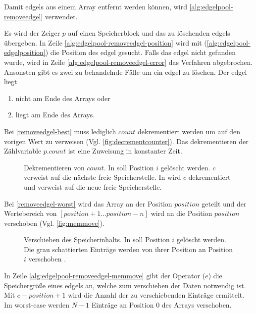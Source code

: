 Damit \glspl{edgel} aus einem Array entfernt werden können, wird \autoref{alg:edgelpool-removeedgel} verwendet.

Es wird der Zeiger $p$ auf einen Speicherblock und das zu löschenden \glspl{edgel} übergeben. In Zeile
 \ref{alg:edgelpool-removeedgel-position} wird mit  (\autoref{alg:edgelpool-edgelposition}) die
 Position des \gls{edgel} gesucht. Falls das \gls{edgel} nicht gefunden wurde, wird in Zeile
 \ref{alg:edgelpool-removeedgel-error} das Verfahren abgebrochen. Ansonsten gibt es zwei zu behandelnde Fälle um ein
 \gls{edgel} zu löschen. Der \gls{edgel} liegt
\begin{enumerate}
	\item nicht am Ende des Arrays oder \label{removeedgel-worst}
	\item liegt am Ende des Arrays. \label{removeedgel-best}
\end{enumerate}
Bei \autoref{removeedgel-best} muss lediglich $\mathit{count}$ dekrementiert werden um auf den vorigen Wert zu
 verweisen (Vgl. \autoref{fig:decrementcounter}). Das dekrementieren der Zählvariable $\mathit{p.count}$ ist eine
 Zuweisung in konstanter Zeit.
\begin{figure}[!ht]
	\centering
	\subfigure[]{
		
		\label{fig:decrementcounter-before}
	}
	\subfigure[]{
		
		\label{fig:decrementcounter-after}
	}
	\caption{Dekrementieren von $\mathit{count}$. In  soll Position $i$ gelöscht
	 werden. $c$ verweist auf die nächste freie Speicherstelle. In  wird $c$
	 dekrementiert und verweist auf die neue freie Speicherstelle.}
	\label{fig:decrementcounter}
\end{figure}
Bei \autoref{removeedgel-worst} wird das Array an der Position $\mathit{position}$ geteilt und der Wertebereich von
 $[\mathit{position}+1 \dotsc \mathit{position}-n]$ wird an die Position $\mathit{position}$ verschoben
 (Vgl. \autoref{fig:memmove}).
\begin{figure}[!ht]
	\centering
	\subfigure[]{
		
		\label{fig:memmove-before}
	}
	\subfigure[]{
		
		\label{fig:memmove-after}
	}
	\caption{Verschieben des Speicherinhalts. In  soll Position $i$ gelöscht werden. Die
	 grau schattierten Einträge werden von ihrer Position an Position $i$ verschoben .}
	\label{fig:memmove}
\end{figure}
In Zeile \ref{alg:edgelpool-removeedgel-memmove} gibt der Operator ($e$) die Speichergröße eines
 \glspl{edgel} an, welche zum verschieben der Daten notwendig ist. Mit $c - \mathit{position} + 1$ wird die Anzahl der
 zu verschiebenden Einträge ermittelt. Im worst-case werden $N-1$ Einträge an Position $0$ des Arrays verschoben.


